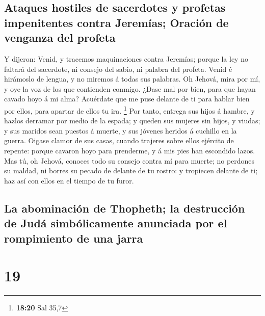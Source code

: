\hypertarget{ataques-hostiles-de-sacerdotes-y-profetas-impenitentes-contra-jeremuxedas-oraciuxf3n-de-venganza-del-profeta}{%
\subsection{Ataques hostiles de sacerdotes y profetas impenitentes
contra Jeremías; Oración de venganza del
profeta}\label{ataques-hostiles-de-sacerdotes-y-profetas-impenitentes-contra-jeremuxedas-oraciuxf3n-de-venganza-del-profeta}}

 Y dijeron: Venid, y tracemos maquinaciones contra
Jeremías; porque la ley no faltará del sacerdote, ni consejo del sabio,
ni palabra del profeta. Venid é hirámoslo de lengua, y no miremos á
todas sus palabras.  Oh Jehová, mira por mí, y oye la voz
de los que contienden conmigo.  ¿Dase mal por bien, para
que hayan cavado hoyo á mi alma? Acuérdate que me puse delante de ti
para hablar bien por ellos, para apartar de ellos tu ira. \footnote{\textbf{18:20}
  Sal 35,7}  Por tanto, entrega sus hijos á hambre, y
hazlos derramar por medio de la espada; y queden sus mujeres sin hijos,
y viudas; y sus maridos sean puestos á muerte, y sus jóvenes heridos á
cuchillo en la guerra.  Oigase clamor de sus casas,
cuando trajeres sobre ellos ejército de repente: porque cavaron hoyo
para prenderme, y á mis pies han escondido lazos.  Mas
tú, oh Jehová, conoces todo su consejo contra mí para muerte; no
perdones su maldad, ni borres su pecado de delante de tu rostro: y
tropiecen delante de ti; haz así con ellos en el tiempo de tu furor.

\hypertarget{la-abominaciuxf3n-de-thopheth-la-destrucciuxf3n-de-juduxe1-simbuxf3licamente-anunciada-por-el-rompimiento-de-una-jarra}{%
\subsection{La abominación de Thopheth; la destrucción de Judá
simbólicamente anunciada por el rompimiento de una
jarra}\label{la-abominaciuxf3n-de-thopheth-la-destrucciuxf3n-de-juduxe1-simbuxf3licamente-anunciada-por-el-rompimiento-de-una-jarra}}

\hypertarget{section-18}{%
\section{19}\label{section-18}}

